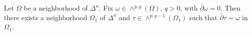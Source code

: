 
Let $\Omega$ be a neighborhood of $\Delta^n$. Fix $\omega \in \wedge^{p,q}(\Omega)$, $q > 0$, with $\bar{\partial}\omega = 0$. Then there exists a neighborhood $\Omega_1$ of $\Delta^n$ and $\tau \in \wedge^{p,q-1}(\Omega_1)$ such that $\bar{\partial}\tau = \omega$ in $\Omega_1$.
